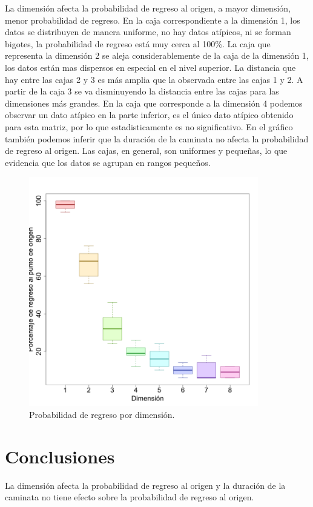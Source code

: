 ﻿\documentclass{article}
\begin{document}
La dimensi\'on afecta la probabilidad de regreso al origen, a mayor
dimensi\'on, menor probabilidad de regreso. En la caja
correspondiente a la dimensi\'on 1, los datos se distribuyen de manera
uniforme, no hay datos at\'ipicos, ni se forman bigotes, la
probabilidad de regreso est\'a muy cerca al 100\%. La caja que
representa la dimensi\'on 2 se aleja considerablemente de la caja de
la dimensi\'on 1, los datos est\'an mas dispersos en especial en el
nivel superior. La distancia que hay entre las cajas 2 y 3 es m\'as
amplia que la observada entre las cajas 1 y 2. A partir de la caja 3
se va disminuyendo la distancia entre las cajas para las dimensiones
m\'as grandes. En la caja que corresponde a la dimensi\'on 4 podemos
observar un dato at\'ipico en la parte inferior, es el \'unico dato
at\'ipico obtenido para esta matriz, por lo que estadisticamente es no
significativo. En el gr\'afico tambi\'en podemos inferir que la
duraci\'on de la caminata no afecta la probabilidad de regreso al
origen. Las cajas, en general, son uniformes y peque\~nas, lo que
evidencia que los datos se agrupan en rangos peque\~nos.

\begin{figure}
  \begin{center}
    \includegraphics[width=10cm]{pr1sim.png}
  \end{center}
  \caption{Probabilidad de regreso por dimensi\'on.}
  \label{f1}
\end{figure}

\section{Conclusiones}\label{con} 
 
La dimensi\'on afecta la probabilidad de regreso al origen y la
duraci\'on de la caminata no tiene efecto sobre la probabilidad de
regreso al origen.




\end{document}
